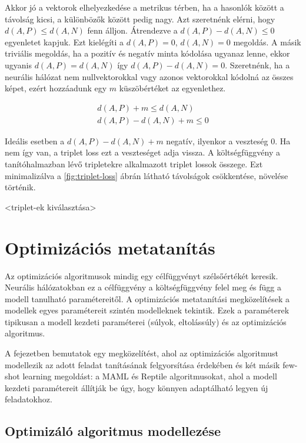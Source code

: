 Akkor jó a vektorok elhelyezkedése a metrikus térben, ha a hasonlók között a távolság kicsi, a különbözők között pedig nagy. Azt szeretnénk elérni, hogy
$d(A, P) \le d(A, N)$ fenn álljon. Átrendezve a $d(A, P) - d(A, N) \le 0$ egyenletet kapjuk. Ezt kielégíti a $d(A, P) = 0$, $d(A, N) = 0$ megoldás. A másik triviális megoldás, ha a pozitív és negatív minta kódolása ugyanaz lenne, ekkor ugyanis $d(A, P) = d(A, N)$ így $d(A, P) - d(A, N) = 0$. Szeretnénk, ha a neurális hálózat nem nullvektorokkal vagy azonos vektorokkal kódolná az összes képet, ezért hozzáadunk egy $m$ küszöbértéket az egyenlethez.

\begin{equation}\label{eq:5}
	\begin{aligned}
		d(A, P) + m \le d(A, N) \\
		d(A, P) - d(A, N) + m \le 0
	\end{aligned}
\end{equation}

Ideális esetben a $d(A, P) - d(A, N) + m$ negatív, ilyenkor a veszteség 0. Ha nem így van, a triplet loss ezt a veszteséget adja vissza. A költségfüggvény a tanítóhalmazban lévő tripletekre alkalmazott triplet lossok összege. Ezt minimalizálva a \ref{fig:triplet-loss} ábrán látható távolságok csökkentése, növelése történik.

<triplet-ek kiválasztása>

\section{Optimizációs metatanítás}

Az optimizációs algoritmusok mindig egy célfüggvényt szélsőértékét keresik. Neurális
hálózatokban ez a célfüggvény a költségfüggvény felel meg és függ a modell tanulható paramétereitől. A optimizációs metatanítási megközelítések a modellek egyes paramétereit szintén modelleknek tekintik. Ezek a paraméterek tipikusan a modell kezdeti paraméterei (súlyok, eltolássúly) és az optimizációs algoritmus.

A fejezetben bemutatok egy megközelítést, ahol az optimizációs algoritmust modellezik az adott feladat tanításának felgyorsítása érdekében és két másik few-shot learning megoldást: a MAML és Reptile algoritmusokat, ahol a modell kezdeti paramétereit állítják be úgy, hogy könnyen adaptálható legyen új feladatokhoz.

\subsection{Optimizáló algoritmus modellezése}


